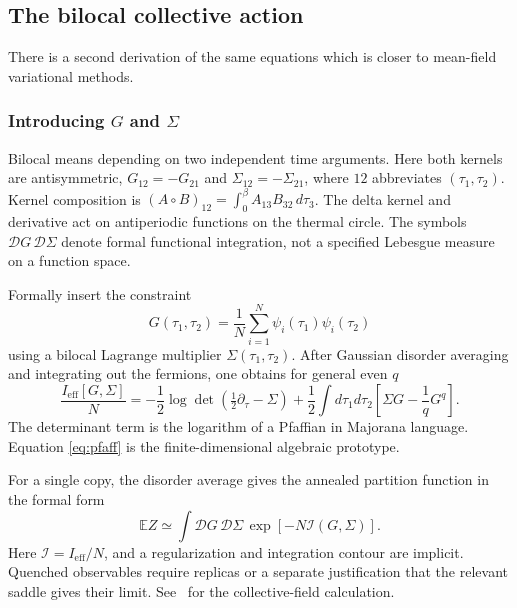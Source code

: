 \documentclass[11pt]{article}
\numberwithin{equation}{section}
\theoremstyle{exposition}
\theoremstyle{result}
\newcommand{\E}{\mathbb E}
\begin{document}
\subsection{The bilocal collective action}

There is a second derivation of the same equations which is closer to mean-field variational methods.

\subsubsection{Introducing $G$ and $\Sigma$}


Bilocal means depending on two independent time arguments. Here both kernels are antisymmetric, $G_{12}=-G_{21}$ and $\Sigma_{12}=-\Sigma_{21}$, where $12$ abbreviates $(\tau_1,\tau_2)$. Kernel composition is $(A\circ B)_{12}=\int_0^\beta A_{13}B_{32}\,d\tau_3$. The delta kernel and derivative act on antiperiodic functions on the thermal circle. The symbols $\mathcal DG\,\mathcal D\Sigma$ denote formal functional integration, not a specified Lebesgue measure on a function space.

Formally insert the constraint
\begin{equation*}
G(\tau_1,\tau_2)
=\frac1N\sum_{i=1}^{N}\psi_i(\tau_1)\psi_i(\tau_2)
\end{equation*}
using a bilocal Lagrange multiplier $\Sigma(\tau_1,\tau_2)$. After Gaussian disorder averaging and integrating out the fermions, one obtains for general even $q$
\begin{equation}
\frac{I_{\mathrm{eff}}[G,\Sigma]}{N}
=-\frac12\log\det(\tfrac12\partial_\tau-\Sigma)
+\frac12\int d\tau_1d\tau_2
\left[
\Sigma G-\frac1qG^q
\right].
\label{eq:collective}
\end{equation}
The determinant term is the logarithm of a Pfaffian in Majorana language. Equation \eqref{eq:pfaff} is the finite-dimensional algebraic prototype.

For a single copy, the disorder average gives the annealed partition function in the formal form
\begin{equation*}
\E Z\simeq\int \mathcal DG\,\mathcal D\Sigma\,
\exp\left[-N\mathcal I(G,\Sigma)\right].
\end{equation*}
Here $\mathcal I=I_{\mathrm{eff}}/N$, and a regularization and integration contour are implicit. Quenched observables require replicas or a separate justification that the relevant saddle gives their limit. See~\cite{MaldacenaStanford,KitaevSuh} for the collective-field calculation.
\end{document}
